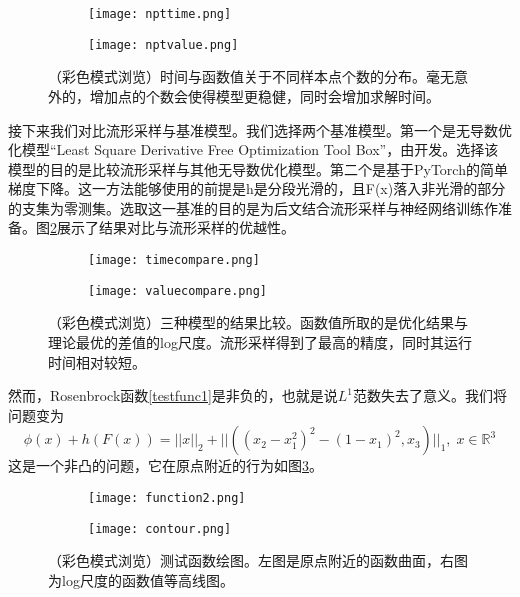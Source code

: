 \documentclass[macfonts]{njuthesis}
\begin{document}
\begin{figure}[ht!]
    \centering
    \begin{subfigure}{.45\textwidth}
    	\centering
        \texttt{[image: npttime.png]}
    \end{subfigure}
    \begin{subfigure}{.45\textwidth}
    	\centering
        \texttt{[image: nptvalue.png]}
    \end{subfigure}
    \caption{（彩色模式浏览）时间与函数值关于不同样本点个数的分布。毫无意外的，增加点的个数会使得模型更稳健，同时会增加求解时间。}
\label{fig:npt}
\end{figure}


接下来我们对比流形采样与基准模型。我们选择两个基准模型。第一个是无导数优化模型“Least Square Derivative Free Optimization Tool Box”，由\cite{dfols}开发。选择该模型的目的是比较流形采样与其他无导数优化模型。第二个是基于PyTorch的简单梯度下降。这一方法能够使用的前提是h是分段光滑的，且F(x)落入非光滑的部分的支集为零测集。选取这一基准的目的是为后文结合流形采样与神经网络训练作准备。图\ref{fig:compare}展示了结果对比与流形采样的优越性。

  \begin{figure}[ht!]
    \centering
    \begin{subfigure}{.4\textwidth}
    	\centering
        \texttt{[image: timecompare.png]}
    \end{subfigure}
    \begin{subfigure}{.5\textwidth}
    	\centering
        \texttt{[image: valuecompare.png]}
    \end{subfigure}
    \caption{（彩色模式浏览）三种模型的结果比较。函数值所取的是优化结果与理论最优的差值的log尺度。流形采样得到了最高的精度，同时其运行时间相对较短。}
\label{fig:compare}
\end{figure}
 
 然而，Rosenbrock函数\ref{testfunc1}是非负的，也就是说$L^1$范数失去了意义。我们将问题变为
\begin{equation}
\label{testfunc2}
\phi(x)+h(F(x))=||x||_2+||((x_2-x_1^2)^2-(1-x_1)^2,x_3)||_1,\;x\in \mathbb{R}^3
\end{equation}
这是一个非凸的问题，它在原点附近的行为如图\ref{fig:function2}。

  \begin{figure}[ht!]
    \centering
    \begin{subfigure}{.45\textwidth}
    	\centering
        \texttt{[image: function2.png]}
    \end{subfigure}
    \begin{subfigure}{.45\textwidth}
    	\centering
        \texttt{[image: contour.png]}
    \end{subfigure}
    \caption{（彩色模式浏览）测试函数绘图。左图是原点附近的函数曲面，右图为log尺度的函数值等高线图。}
\label{fig:function2}
\end{figure}
\end{document}
